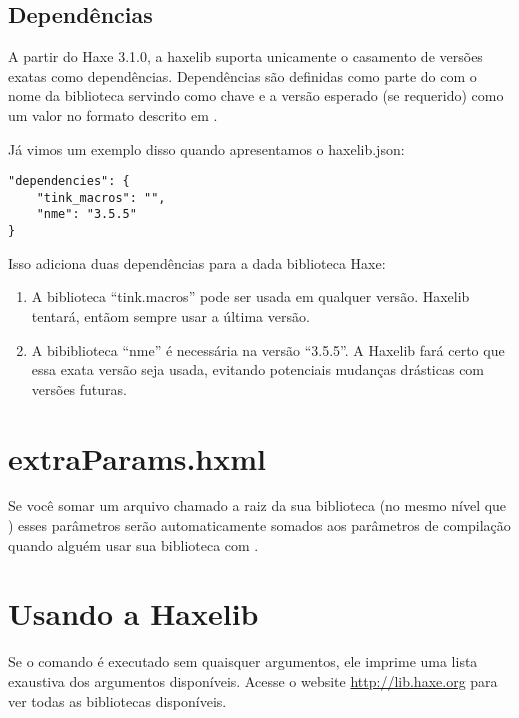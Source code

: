 {\subsection{Dependências}
\label{haxelib-json-dependencies}

A partir do Haxe 3.1.0, a haxelib suporta unicamente o casamento de versões exatas como dependências. Dependências são definidas como parte do  com o nome da biblioteca servindo como chave e a versão esperado (se requerido) como um valor no formato descrito em .

Já vimos um exemplo disso quando apresentamos o haxelib.json:

\begin{lstlisting}
"dependencies": {
    "tink_macros": "",
    "nme": "3.5.5"
}
\end{lstlisting}

Isso adiciona duas dependências para a dada biblioteca Haxe:

\begin{enumerate}
    \item A biblioteca ``tink.macros'' pode ser usada em qualquer versão. Haxelib tentará, entãom sempre usar a última versão.
    \item A bibiblioteca ``nme'' é necessária na versão ``3.5.5''. A Haxelib fará certo que essa exata versão seja usada, evitando potenciais mudanças drásticas com versões futuras.
\end{enumerate}

\section{extraParams.hxml}
\label{haxelib-extraParams}

Se você somar um arquivo chamado  a raiz da sua biblioteca (no mesmo nível que ) esses parâmetros serão automaticamente somados aos parâmetros de compilação quando alguém usar sua biblioteca com .

\section{Usando a Haxelib}
\label{haxelib-using}

Se o comando  é executado sem quaisquer argumentos, ele imprime uma lista exaustiva dos argumentos disponíveis. Acesse o website \url{http://lib.haxe.org} para ver todas as bibliotecas disponíveis.

}
